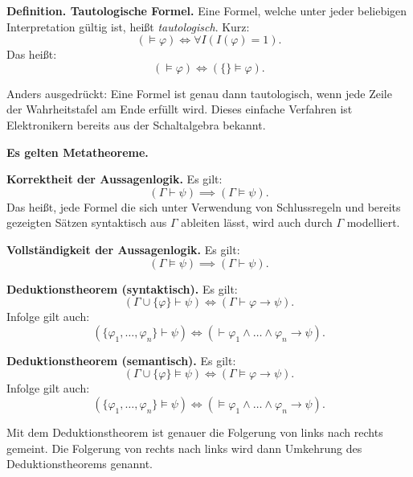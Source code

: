 \documentclass[9pt]{beamer}
\newcommand{\strong}[1]{\textsf{\textbf{#1}}}
\begin{document}
\begin{frame}
\strong{Definition. Tautologische Formel.}
Eine Formel, welche unter jeder beliebigen Interpretation
gültig ist, heißt \emph{tautologisch}. Kurz:
\[(\models\varphi) \iff \forall I(I(\varphi)=1).\]
Das heißt:
\[(\models\varphi) \iff (\{\}\models\varphi).\]
\end{frame}

\begin{frame}
Anders ausgedrückt: Eine Formel ist genau dann tautologisch,
wenn jede Zeile der Wahrheitstafel am Ende erfüllt wird.
Dieses einfache Verfahren ist Elektronikern bereits aus der
Schaltalgebra bekannt.
\end{frame}

\begin{frame}
\strong{Es gelten Metatheoreme.}
\end{frame}

\begin{frame}
\strong{Korrektheit der Aussagenlogik.}
Es gilt:
\[(\Gamma\vdash\psi)\implies (\Gamma\models\psi).\]
Das heißt, jede Formel die sich unter Verwendung von
Schlussregeln und bereits gezeigten Sätzen syntaktisch aus $\Gamma$
ableiten lässt, wird auch durch $\Gamma$ modelliert.
\end{frame}

\begin{frame}
\strong{Vollständigkeit der Aussagenlogik.}
Es gilt:
\[(\Gamma\models\psi)\implies (\Gamma\vdash\psi).\]
\end{frame}

\begin{frame}
\strong{Deduktionstheorem (syntaktisch).}
Es gilt:
\[(\Gamma\cup\{\varphi\}\vdash\psi)
\iff(\Gamma\vdash\varphi\rightarrow\psi).\]
Infolge gilt auch:
\[(\{\varphi_1,\ldots,\varphi_n\}\vdash\psi)
\iff (\vdash\varphi_1\land\ldots\land\varphi_n\rightarrow\psi).\]
\end{frame}

\begin{frame}
\strong{Deduktionstheorem (semantisch).}
Es gilt:
\[(\Gamma\cup\{\varphi\}\models\psi)
\iff(\Gamma\models\varphi\rightarrow\psi).\]
Infolge gilt auch:
\[(\{\varphi_1,\ldots,\varphi_n\}\models\psi)
\iff (\models\varphi_1\land\ldots\land\varphi_n\rightarrow\psi).\]
\end{frame}

\begin{frame}
Mit dem Deduktionstheorem ist genauer die Folgerung von links nach
rechts gemeint. Die Folgerung von rechts nach links wird dann
Umkehrung des Deduktionstheorems genannt.
\end{frame}
\end{document}
